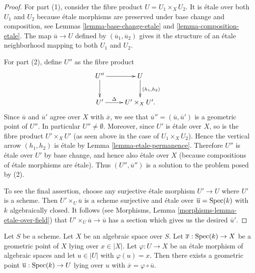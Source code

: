 \begin{proof}
For part (1), consider the fibre product $U = U_1 \times_X U_2$.
It is \'etale over both $U_1$ and $U_2$ because \'etale morphisms are
preserved under base change and composition, see
Lemmas \ref{lemma-base-change-etale} and \ref{lemma-composition-etale}.
The map $\overline{u} \to U$ defined by $(\overline{u}_1, \overline{u}_2)$
gives it the structure of an \'etale neighborhood mapping to both
$U_1$ and $U_2$.

\medskip\noindent
For part (2), define $U''$ as the fibre product
$$
\xymatrix{
U'' \ar[r] \ar[d] & U \ar[d]^{(h_1, h_2)} \\
U' \ar[r]^-\Delta & U' \times_X U'.
}
$$
Since $\overline{u}$ and $\overline{u}'$ agree over $X$ with $\overline{x}$,
we see that $\overline{u}'' = (\overline{u}, \overline{u}')$ is a geometric
point of $U''$. In particular $U'' \not = \emptyset$.
Moreover, since $U'$ is \'etale over $X$, so is the fibre product
$U'\times_X U'$ (as seen above in the case of $U_1 \times_X U_2$).
Hence the vertical arrow $(h_1, h_2)$ is \'etale by
Lemma \ref{lemma-etale-permanence}.
Therefore $U''$ is \'etale over $U'$ by base change, and hence also
\'etale over $X$ (because compositions of \'etale morphisms are \'etale).
Thus $(U'', \overline{u}'')$ is a solution to the problem posed by (2).

\medskip\noindent
To see the final assertion, choose any surjective \'etale morphism
$U' \to U$ where $U'$ is a scheme. Then
$U' \times_U \overline{u}$ is a scheme surjective and \'etale over
$\overline{u} = \mathop{\mathrm{Spec}}(k)$ with $k$ algebraically closed.
It follows (see
Morphisms, Lemma \ref{morphisms-lemma-etale-over-field})
that $U' \times_U \overline{u} \to \overline{u}$ has a section
which gives us the desired $\overline{u}'$.
\end{proof}

\begin{lemma}
\label{lemma-geometric-lift-to-usual}
Let $S$ be a scheme. Let $X$ be an algebraic space over $S$.
Let $\overline{x} : \mathop{\mathrm{Spec}}(k) \to X$ be a geometric point of $X$
lying over $x \in |X|$. Let $\varphi : U \to X$ be an \'etale morphism
of algebraic spaces and let $u \in |U|$ with $\varphi(u) = x$.
Then there exists a geometric point
$\overline{u} : \mathop{\mathrm{Spec}}(k) \to U$ lying over $u$ with
$\overline{x} = \varphi \circ \overline{u}$.
\end{lemma}

